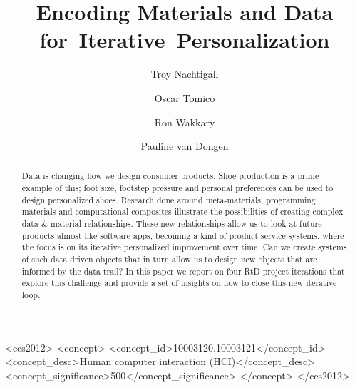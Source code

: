 \documentclass[sigconf]{acmart}
\begin{document}
\title{Encoding Materials and Data  for~Iterative~Personalization
}
\subtitle{}


\author{Troy Nachtigall}

\author{Oscar Tomico}

\author{Ron Wakkary}

\author{Pauline van Dongen}

\renewcommand{\shortauthors}{T. Nachtigall et al.}


\begin{abstract}
Data is changing how we design consumer products. Shoe production is a prime example of this; foot size, footstep pressure and personal preferences can be used to design personalized shoes. Research done around meta-materials, programming materials and computational composites illustrate the possibilities of creating complex data \& material relationships. These new relationships allow us to look at future products almost like software apps, becoming a kind of product service systems, where the focus is on its iterative personalized improvement over time. Can we create systems of such data driven objects that in turn allow us to design new objects that are informed by the data trail? In this paper we report on four RtD project iterations that explore this challenge and provide a set of insights on how to close this new iterative loop.
\end{abstract}

%
%
\begin{CCSXML}
<ccs2012>
<concept>
<concept_id>10003120.10003121</concept_id>
<concept_desc>Human computer interaction (HCI)</concept_desc>
<concept_significance>500</concept_significance>
</concept>
</ccs2012>
\end{CCSXML}

\end{document}
